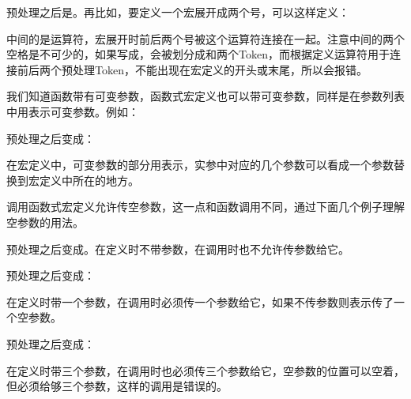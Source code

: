 预处理之后是。再比如，要定义一个宏展开成两个\BookCode{\#}号，可以这样定义：




中间的\BookCode{\#\#}是运算符，宏展开时前后两个\BookCode{\#}号被这个运算符连接在一起。注意中间的两个空格是不可少的，如果写成\BookCode{\#\#\#\#}，会被划分成\BookCode{\#\#}和\BookCode{\#\#}两个Token，而根据定义\BookCode{\#\#}运算符用于连接前后两个预处理Token，不能出现在宏定义的开头或末尾，所以会报错。



我们知道函数带有可变参数，函数式宏定义也可以带可变参数，同样是在参数列表中用表示可变参数。例如：




预处理之后变成：




在宏定义中，可变参数的部分用表示，实参中对应的几个参数可以看成一个参数替换到宏定义中所在的地方。



调用函数式宏定义允许传空参数，这一点和函数调用不同，通过下面几个例子理解空参数的用法。




预处理之后变成。在定义时不带参数，在调用时也不允许传参数给它。




预处理之后变成：




在定义时带一个参数，在调用时必须传一个参数给它，如果不传参数则表示传了一个空参数。




预处理之后变成：




在定义时带三个参数，在调用时也必须传三个参数给它，空参数的位置可以空着，但必须给够三个参数，这样的调用是错误的。


